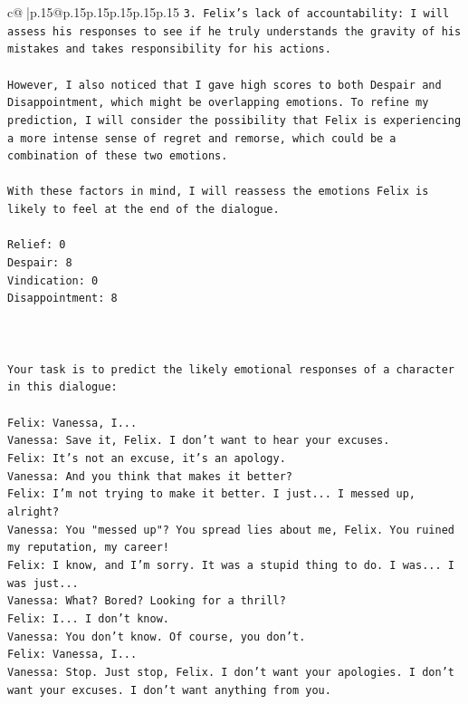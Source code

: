 \documentclass{article}
\begin{document}
{\begin{supertabular}{c@{$\;$}|p{.15\linewidth}@{}p{.15\linewidth}p{.15\linewidth}p{.15\linewidth}p{.15\linewidth}p{.15\linewidth}}
{{{\texttt{3. Felix's lack of accountability: I will assess his responses to see if he truly understands the gravity of his mistakes and takes responsibility for his actions.} \\
\\ 
\texttt{However, I also noticed that I gave high scores to both Despair and Disappointment, which might be overlapping emotions. To refine my prediction, I will consider the possibility that Felix is experiencing a more intense sense of regret and remorse, which could be a combination of these two emotions.} \\
\\ 
\texttt{With these factors in mind, I will reassess the emotions Felix is likely to feel at the end of the dialogue.} \\
\\ 
\texttt{Relief: 0} \\
\texttt{Despair: 8} \\
\texttt{Vindication: 0} \\
\texttt{Disappointment: 8} \\
\\ 
\\ 
\\ 
\texttt{Your task is to predict the likely emotional responses of a character in this dialogue:} \\
\\ 
\texttt{Felix: Vanessa, I...} \\
\texttt{Vanessa: Save it, Felix. I don't want to hear your excuses.} \\
\texttt{Felix: It's not an excuse, it's an apology.} \\
\texttt{Vanessa: And you think that makes it better? } \\
\texttt{Felix: I'm not trying to make it better. I just... I messed up, alright?} \\
\texttt{Vanessa: You "messed up"? You spread lies about me, Felix. You ruined my reputation, my career!} \\
\texttt{Felix: I know, and I'm sorry. It was a stupid thing to do. I was... I was just...} \\
\texttt{Vanessa: What? Bored? Looking for a thrill? } \\
\texttt{Felix: I... I don't know.} \\
\texttt{Vanessa: You don't know. Of course, you don't.} \\
\texttt{Felix: Vanessa, I...} \\
\texttt{Vanessa: Stop. Just stop, Felix. I don't want your apologies. I don't want your excuses. I don't want anything from you.} \\
}}}
\end{supertabular}}
\end{document}
